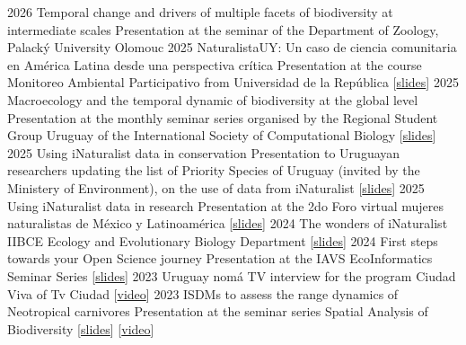 \documentclass[9pt]{developercv} %
\begin{document}
\begin{entrylist}
	\entrylong
		{2026}
		{Temporal change and drivers of multiple facets of biodiversity at intermediate scales}
		{}
		{Presentation at the seminar of the Department of Zoology, Palacký University Olomouc}
	\entrylong
		{2025}
		{NaturalistaUY: Un caso de ciencia comunitaria en América Latina desde una perspectiva crítica}
		{}
		{Presentation at the course Monitoreo Ambiental Participativo from Universidad de la República [\href{https://flograttarola.com/talk/naturalistauy-un-caso-de-ciencia-comunitaria-en-america-latina-desde-una-perspectiva-critica/EP_Monitoreo_Ambiental_Participativo_2025.pdf}{slides}]}
	\entrylong
		{2025}
		{Macroecology and the temporal dynamic of biodiversity at the global level}
		{}
		{Presentation at the monthly seminar series organised by the Regional Student Group Uruguay of the International Society of Computational Biology [\href{https://flograttarola.com/talk/macroecologia-y-la-dinamica-temporal-de-la-biodiversidad-a-nivel-global/ISCB-RSG_Uruguay.pdf}{slides}]}
	\entrylong
		{2025}
		{Using iNaturalist data in conservation}
		{}
		{Presentation to Uruguayan researchers updating the list of Priority Species of Uruguay (invited by the Ministery of Environment), on the use of data from iNaturalist [\href{https://flograttarola.com/talk/uso-de-datos-de-naturalistauy/CURE_SNAP_2025.pdf}{slides}]}
	\entrylong
		{2025}
		{Using iNaturalist data in research}
		{}
		{Presentation at the 2do Foro virtual mujeres naturalistas de México y Latinoamérica [\href{https://flograttarola.com/talk/uso-de-datos-de-inaturalist-en-la-investigacion/Foro_Mujeres_Naturalistas.pdf}{slides}]}
	\entrylong
		{2024}
		{The wonders of iNaturalist}
		{}
		{IIBCE Ecology and Evolutionary Biology Department [\href{https://flograttarola.com/talk/las-maravillas-de-inaturalist/iNat_DEB-IIBCE_seminario.pdf}{slides}]}
	\entrylong
		{2024}
		{First steps towards your Open Science journey}
		{}
		{Presentation at the IAVS EcoInformatics Seminar Series [\href{https://flograttarola.com/talk/first-steps-towards-your-open-science-journey/IAVS-EcoInfo_OpenScience_Flo.pdf}{slides}]}
	\entrylong
		{2023}
		{Uruguay nomá}
		{}
		{TV interview for the program Ciudad Viva of Tv Ciudad [\href{https://youtu.be/Edfpt810rt0}{video}]}
	\entrylong
		{2023}
		{ISDMs to assess the range dynamics of Neotropical carnivores}
		{}
		{Presentation at the seminar series Spatial Analysis of Biodiversity [\href{https://flograttarola.com/Modelado_de_NE_y_DG.pdf}{slides}] [\href{https://www.youtube.com/live/F0BpYC3iE4g}{video}]}
	\entrylong

\end{entrylist}
\end{document}
